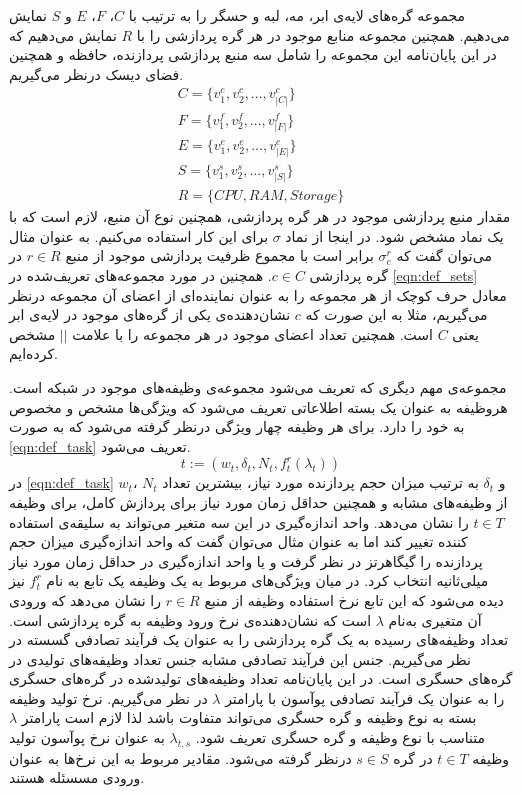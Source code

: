 	مجموعه‌ گره‌های لایه‌ی ابر، مه، لبه و حسگر را به ترتیب با $C$، $F$، $E$ و $S$ نمایش می‌دهیم. همچنین مجموعه منابع موجود در هر گره پردازشی را با $R$ نمایش می‌دهیم که در این پایان‌نامه این مجموعه را شامل سه منبع پردازشی پردازنده، حافظه و همچنین فضای دیسک درنظر می‌گیریم. 
    \begin{subequations}\label{eqn:def_sets}
    	\begin{align}
    	C = \{v_1^c, v_2^c, ..., v_{|C|}^c\} \\
    	F = \{v_1^f, v_2^f, ..., v_{|F|}^f\} \\
    	E = \{v_1^e, v_2^e, ..., v_{|E|}^e\} \\
    	S = \{v_1^s, v_2^s, ..., v_{|S|}^s\} \\
    	R = \{CPU, RAM, Storage\}
    	\end{align}
    \end{subequations}
	مقدار منبع پردازشی موجود در هر گره پردازشی، همچنین نوع آن منبع، لازم است که با یک نماد مشخص شود. در اینجا از نماد $\sigma$ برای این کار استفاده می‌کنیم. به عنوان مثال می‌توان گفت که $\sigma_c^r$ برابر است با مجموع ظرفیت پردازشی موجود از منبع $r \in R$ در گره پردازشی $c \in C$. 
    همچنین در مورد مجموعه‌های تعریف‌‌شده در \cref{eqn:def_sets} معادل حرف کوچک از هر مجموعه را به عنوان نماینده‌ای از اعضای آن مجموعه درنظر می‌گیریم، مثلا به‌ این ‌صورت که $c$ نشان‌دهنده‌ی یکی از گره‌های موجود در لایه‌ی ابر یعنی $C$ است. همچنین تعداد اعضای موجود در هر مجموعه را با علامت $||$ مشخص کرده‌ایم. 
    
    مجموعه‌ی مهم دیگری که تعریف می‌شود مجموعه‌ی وظیفه‌های موجود در شبکه است.
    هروظیفه به عنوان یک بسته اطلاعاتی تعریف می‌شود که ویژگی‌ها مشخص و مخصوص به خود را دارد. برای هر وظیفه چهار ویژگی درنظر گرفته می‌شود که به صورت \cref{eqn:def_task} تعریف می‌شود. 
	\begin{equation}\label{eqn:def_task}
		t := (w_t, \delta_t, N_t, f_t^r(\lambda_t))
	\end{equation}
	در \cref{eqn:def_task} $w_t$، $N_t$ و $\delta_t$ به ترتیب میزان حجم پردازنده مورد نیاز، بیشترین تعداد از وظیفه‌های مشابه و همچنین حداقل زمان مورد نیاز برای پردازش کامل، برای وظیفه $t \in T$ را نشان می‌دهد. واحد اندازه‌گیری در این سه متغیر می‌تواند به سلیقه‌ی استفاده کننده تغییر کند اما به عنوان مثال می‌توان گفت که واحد اندازه‌گیری میزان حجم پردازنده را گیگاهرتز در نظر گرفت  و یا واحد اندازه‌گیری در حداقل زمان مورد نیاز میلی‌ثانیه انتخاب کرد. در میان ویژگی‌های مربوط به یک وظیفه یک تابع به نام $f_t^r$ نیز دیده می‌شود که این تابع نرخ استفاده وظیفه از منبع $r \in R$ را نشان می‌دهد که ورودی آن متغیری به‌نام $\lambda$ است که نشان‌دهنده‌ی نرخ ورود وظیفه به گره پردازشی است. تعداد وظیفه‌های رسیده به یک گره پردازشی را به عنوان یک فرآیند تصادفی گسسته در نظر می‌گیریم. جنس این فرآیند تصادفی مشابه جنس تعداد وظیفه‌های تولیدی در گره‌های حسگری است. در این پایان‌نامه تعداد وظیفه‌های تولیدشده در گره‌های حسگری را به عنوان یک فرآیند تصادفی پوآسون با پارامتر $\lambda$ در نظر می‌گیریم. 
	نرخ تولید وظیفه بسته به نوع وظیفه و گره حسگری می‌تواند متفاوت باشد لذا لازم است پارامتر $\lambda$ متناسب با نوع وظیفه و گره حسگری تعریف شود. $\lambda_{t,s}$ به عنوان نرخ پوآسون تولید وظیفه $t \in T$ در گره $s \in S$ درنظر گرفته می‌شود. مقادیر مربوط به این نرخ‌ها به عنوان ورودی مسسئله هستند.
	
